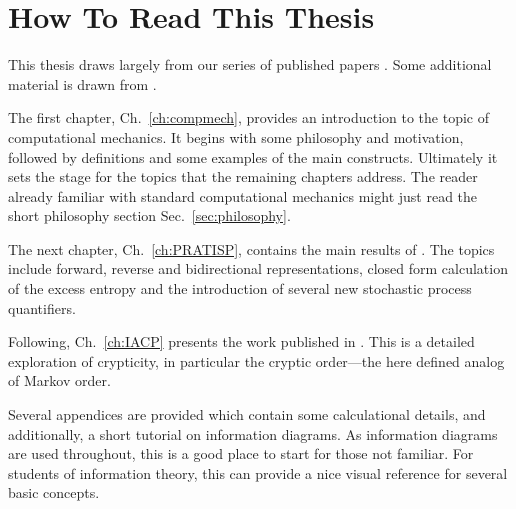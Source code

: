 \ifx\master\undefined\fi

\prelimheaders

\chapter*{How To Read This Thesis}
\label{ch:0}

This thesis draws largely from our series of published papers . Some additional material is drawn from .

The first chapter, Ch.~\ref{ch:compmech}, provides an introduction to the topic of computational mechanics. It begins with some philosophy and motivation, followed by definitions and some examples of the main constructs. Ultimately it sets the stage for the topics that the remaining chapters address. The reader already familiar with standard computational mechanics might just read the short philosophy section Sec.~\ref{sec:philosophy}.

The next chapter, Ch.~\ref{ch:PRATISP}, contains the main results of . The topics include forward, reverse and bidirectional representations, closed form calculation of the excess entropy and the introduction of several new stochastic process quantifiers.

Following, Ch.~\ref{ch:IACP} presents the work published in . This is a detailed exploration of crypticity, in particular the cryptic order---the here defined analog of Markov order.

Several appendices are provided which contain some calculational details, and additionally, a short tutorial on information diagrams. As information diagrams are used throughout, this is a good place to start for those not familiar. For students of information theory, this can provide a nice visual reference for several basic concepts.

\ifx\master\undefined\fi
